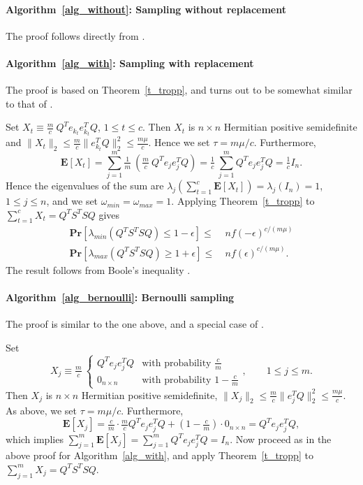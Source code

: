 \documentclass{siamltex}
\begin{document}
\paragraph{Algorithm~\ref{alg_without}: Sampling without replacement}
The proof follows directly from \cite[Lemma 3.4]{tropp11b}.

\paragraph{Algorithm~\ref{alg_with}: Sampling with replacement}
The proof is based on Theorem~\ref{t_tropp}, and
turns out to be somewhat similar to that of \cite[Lemma 3.4]{tropp11b}.

Set $X_t\equiv\frac{m}{c}\>Q^Te_{k_t}e_{k_t}^TQ$, $1\leq t\leq c$.
Then $X_t$ is $n\times n$  Hermitian positive semidefinite and
$\|X_t\|_2\leq\tfrac{m}{c}\|e_{k_t}^TQ\|_2^2\leq \tfrac{m\mu}{c}$.
Hence we set $\tau=m\mu/c$.
Furthermore,
$${\mathbf{E}}[X_t]=\sum_{j=1}^m{\tfrac{1}{m}\>
\left(\tfrac{m}{c}\>Q^Te_je_j^TQ\right)}=
\tfrac{1}{c}\>\sum_{j=1}^m{Q^Te_je_j^TQ}=\tfrac{1}{c} I_n.$$
Hence the eigenvalues of the sum are
$\lambda_j\left(\sum_{t=1}^c{{\mathbf{E}}[X_t]}\right)=\lambda_j(I_n)=1$,
$1\leq j\leq n$, and we set $\omega_{min}=\omega_{max}=1$.
Applying Theorem~\ref{t_tropp} to $\sum_{t=1}^c{X_t}=Q^TS^TSQ$ gives
\begin{eqnarray*}
{\mathbf{Pr}}\left[\lambda_{min}\left(Q^TS^TSQ\right) 
\leq 1-\epsilon \right]\leq\ &  n f(-\epsilon)^{c/(m\mu)}\\
{\mathbf{Pr}}\left[\lambda_{max}\left(Q^TS^TSQ\right) 
\geq 1+\epsilon \right]\leq\ & n f(\epsilon)^{c/(m\mu)}.
\end{eqnarray*}
The result follows from Boole's inequality \cite[p. 16]{Ross}.

\paragraph{Algorithm~\ref{alg_bernoulli}: Bernoulli sampling}
The proof is similar to the one above, and a special case of
\cite[Theorem 6.1]{GT11}. 

Set
$$X_j\equiv\tfrac{m}{c}\> \begin{cases}
Q^Te_je_j^TQ & \text{with probability $\frac{c}{m}$}\\
0_{n\times n}& \text{with probability $1-\frac{c}{m}$} 
\end{cases}, \qquad 1\leq j\leq m.$$
Then $X_j$ is $n\times n$  Hermitian positive semidefinite,
$\|X_j\|_2\leq\tfrac{m}{c}\|e_j^TQ\|_2^2\leq \tfrac{m\mu}{c}$.
As above, we set $\tau=m\mu/c$.
Furthermore,
$${\mathbf{E}}[X_j]=\tfrac{c}{m}\cdot \tfrac{m}{c}Q^Te_je_j^TQ
+(1-\tfrac{c}{m})\cdot 0_{n\times n}=Q^Te_je_j^TQ,$$
which implies $\sum_{j=1}^m{{\mathbf{E}}[X_j]}=\sum_{j=1}^m{Q^Te_je_j^TQ}=I_n$.
Now proceed as in the above proof for Algorithm~\ref{alg_with}, and 
apply Theorem~\ref{t_tropp} to $\sum_{j=1}^m{X_j}=Q^TS^TSQ$.
\end{document}
